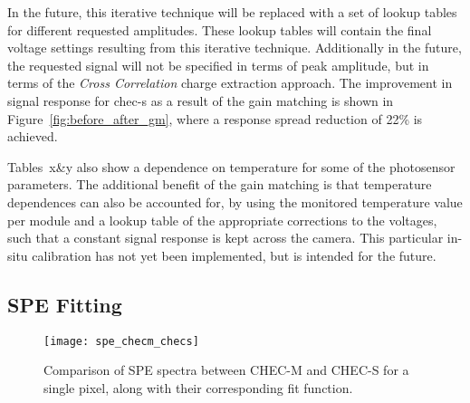 In the future, this iterative technique will be replaced with a set of lookup tables for different requested amplitudes. These lookup tables will contain the final voltage settings resulting from this iterative technique. Additionally in the future, the requested signal will not be specified in terms of peak amplitude, but in terms of the \textit{Cross Correlation} charge extraction approach. The improvement in signal response for \gls{chec-s} as a result of the gain matching is shown in Figure~\ref{fig:before_after_gm}, where a response spread reduction of 22\% is achieved.

Tables~x\&y also show a dependence on temperature for some of the photosensor parameters. The additional benefit of the gain matching is that temperature dependences can also be accounted for, by using the monitored temperature value per module and a lookup table of the appropriate corrections to the voltages, such that a constant signal response is kept across the camera. This particular in-situ calibration has not yet been implemented, but is intended for the future.


\subsection{SPE Fitting}

\begin{figure}
	\centering
    \texttt{[image: spe\_checm\_checs]} 
	\caption[Comparison of SPE spectra between CHEC-M and CHEC-S.]{Comparison of SPE spectra between CHEC-M and CHEC-S for a single pixel, along with their corresponding fit function.} 
	\label{fig:spe_checm_checs}
\end{figure}

